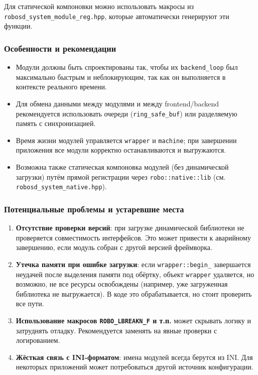 \documentclass[a4paper,12pt]{article}
\begin{document}
Для статической компоновки можно использовать макросы из \texttt{robosd\_system\_module\_reg.hpp}, которые автоматически генерируют эти функции.

\subsubsection{Особенности и рекомендации}

\begin{itemize}
    \item Модули должны быть спроектированы так, чтобы их \texttt{backend\_loop} был максимально быстрым и неблокирующим, так как он выполняется в контексте реального времени.
    \item Для обмена данными между модулями и между frontend/backend рекомендуется использовать очереди (\texttt{ring\_safe\_buf}) или разделяемую память с синхронизацией.
    \item Время жизни модулей управляется \texttt{wrapper} и \texttt{machine}; при завершении приложения все модули корректно останавливаются и выгружаются.
    \item Возможна также статическая компоновка модулей (без динамической загрузки) путём прямой регистрации через \texttt{robo::native::lib} (см. \texttt{robosd\_system\_native.hpp}).
\end{itemize}

\subsubsection{Потенциальные проблемы и устаревшие места}

\begin{enumerate}
    \item \textbf{Отсутствие проверки версий}: при загрузке динамической библиотеки не проверяется совместимость интерфейсов. Это может привести к аварийному завершению, если модуль собран с другой версией фреймворка.
    \item \textbf{Утечка памяти при ошибке загрузки}: если \texttt{wrapper::begin\_} завершается неудачей после выделения памяти под обёртку, объект \texttt{wrapper} удаляется, но возможно, не все ресурсы освобождены (например, уже загруженная библиотека не выгружается). В коде это обрабатывается, но стоит проверить все пути.
    \item \textbf{Использование макросов \texttt{ROBO\_LBREAKN\_F} и т.п.} может скрывать логику и затруднять отладку. Рекомендуется заменять на явные проверки с логированием.
    \item \textbf{Жёсткая связь с INI-форматом}: имена модулей всегда берутся из INI. Для некоторых приложений может потребоваться другой источник конфигурации.
\end{enumerate}
\end{document}
